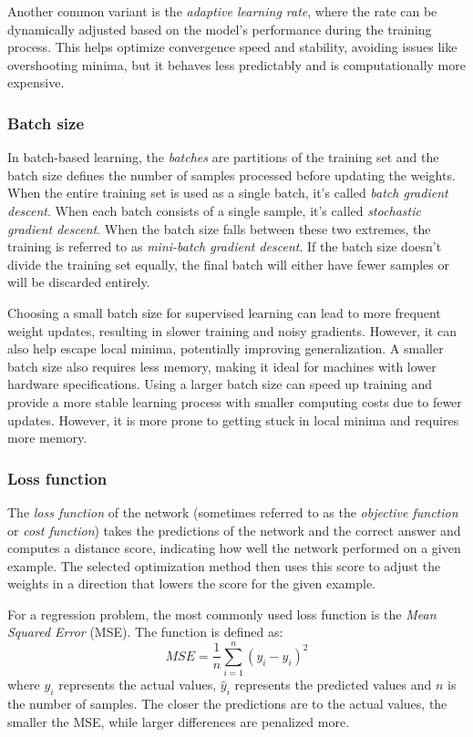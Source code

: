 \documentclass[a4paper,oneside,onecolumn,12pt]{book}
\begin{document}
		Another common variant is the \textit{adaptive learning rate}, where the rate can be dynamically adjusted based on the model's performance during the training process. This helps optimize convergence speed and stability, avoiding issues like overshooting minima, but it behaves less predictably and is computationally more expensive. \cite{LRSALRMDL}

		\subsubsection{Batch size}
		In batch-based learning, the \textit{batches} are partitions of the training set and the batch size defines the number of samples processed before updating the weights. When the entire training set is used as a single batch, it's called \textit{batch gradient descent}. When each batch consists of a single sample, it's called \textit{stochastic gradient descent}. When the batch size falls between these two extremes, the training is referred to as \textit{mini-batch gradient descent}. If the batch size doesn't divide the training set equally, the final batch will either have fewer samples or will be discarded entirely. \cite{DBBENN} 

		Choosing a small batch size for supervised learning can lead to more frequent weight updates, resulting in slower training and noisy gradients. However, it can also help escape local minima, potentially improving generalization. A smaller batch size also requires less memory, making it ideal for machines with lower hardware specifications. Using a larger batch size can speed up training and provide a more stable learning process with smaller computing costs due to fewer updates. However, it is more prone to getting stuck in local minima and requires more memory. \cite{HDBSIYML}

		\subsubsection{Loss function}
		The \textit{loss function} of the network (sometimes referred to as the \textit{objective function} or \textit{cost function}) takes the predictions of the network and the correct answer and computes a distance score, indicating how well the network performed on a given example. The selected optimization method then uses this score to adjust the weights in a direction that lowers the score for the given example. \cite{DLP}

		For a regression problem, the most commonly used loss function is the \textit{Mean Squared Error} (MSE). The function is defined as:
		\[ MSE = \frac{1}{n} \sum_{i=1}^{n} (y_i - \hat{y}_i)^2 \]
		where $y_i$ represents the actual values, $\hat{y}_i$ represents the predicted values and $n$ is the number of samples. The closer the predictions are to the actual values, the smaller the MSE, while larger differences are penalized more. \cite{AISL}
\end{document}
